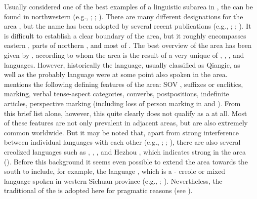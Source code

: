 Usually considered one of the best examples of a linguistic subarea in , the \textbf{} can be found in northwestern  (e.g., \citealt{Dwyer1995}; \citealt{Slater2003a}; \citealt{ZhongJinwen2007}). There are many different designations for the area \citep{Janhunen2007b}, but the name \textit{} has been adopted by several recent publications (e.g., \citealt{Janhunen2012a}; \citealt{Simon2015}; \citealt{SandmanSimon2016}). It is difficult to establish a clear boundary of the area, but it roughly encompasses eastern , parts of northern , and most of . The best overview of the area has been given by \cite{Janhunen2007b,Janhunen2012a}, according to whom the area is the result of a very unique  of , , , and  languages. However, historically the  language, usually classified as Qiangic, as well as the probably  language  were at some point also spoken in the area. \cite[180ff.]{Janhunen2012a} mentions the following defining features of the area: SOV , suffixes or enclitics,  marking, verbal tense-aspect categories, converbs, postpositions, indefinite articles, perspective marking (including loss of person marking in  and ). From this brief list alone, however, this quite clearly does not qualify as a  at all. Most of these features are not only prevalent in adjacent areas, but are also extremely common worldwide. But it may be noted that, apart from strong interference between individual languages with each other (e.g., \citealt{Sandman2012}; \citealt{Simon2015}; \citealt{SandmanSimon2016}), there are also several creolized languages such as , , , and Hezhou , which indicates strong  in the area (). Before this background it seems even possible to extend the area towards the south to include, for example, the language , which is a - creole or mixed language spoken in western Sichuan province (e.g., \citealt{Acuo2001}; \citealt{Chen2017}). Nevertheless, the traditional  of the  is adopted here for pragmatic reasons (see ).